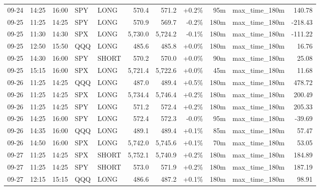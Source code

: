 \documentclass[11pt,a4paper,twoside]{article}
\begin{document}
\begin{center}
\begin{longtable}{>{\color{txtmain}}l l l l l r r r r >{\color{txtmain}}l r}
09-24 & 14:25 & 16:00 & SPY & LONG & 570.4 & 571.2 & \textcolor{wingreen}{+0.2\%} & 95m & max\_time\_180m & \textcolor{wingreen}{140.78} \\
09-25 & 11:25 & 14:25 & SPY & LONG & 570.9 & 569.7 & \textcolor{lossred}{-0.2\%} & 180m & max\_time\_180m & \textcolor{lossred}{-218.43} \\
09-25 & 11:30 & 14:30 & SPX & LONG & 5,730.0 & 5,724.2 & \textcolor{lossred}{-0.1\%} & 180m & max\_time\_180m & \textcolor{lossred}{-111.22} \\
09-25 & 12:50 & 15:50 & QQQ & LONG & 485.6 & 485.8 & \textcolor{wingreen}{+0.0\%} & 180m & max\_time\_180m & \textcolor{wingreen}{16.76} \\
09-25 & 14:30 & 16:00 & SPY & SHORT & 570.2 & 570.0 & \textcolor{wingreen}{+0.0\%} & 90m & max\_time\_180m & \textcolor{wingreen}{25.08} \\
09-25 & 15:15 & 16:00 & SPX & LONG & 5,721.4 & 5,722.6 & \textcolor{wingreen}{+0.0\%} & 45m & max\_time\_180m & \textcolor{wingreen}{11.68} \\
09-26 & 11:25 & 14:25 & QQQ & LONG & 487.0 & 489.4 & \textcolor{wingreen}{+0.5\%} & 180m & max\_time\_180m & \textcolor{wingreen}{478.72} \\
09-26 & 11:25 & 14:25 & SPX & LONG & 5,734.4 & 5,746.4 & \textcolor{wingreen}{+0.2\%} & 180m & max\_time\_180m & \textcolor{wingreen}{200.49} \\
09-26 & 11:25 & 14:25 & SPY & LONG & 571.2 & 572.4 & \textcolor{wingreen}{+0.2\%} & 180m & max\_time\_180m & \textcolor{wingreen}{205.33} \\
09-26 & 14:25 & 16:00 & SPY & LONG & 572.4 & 572.3 & \textcolor{lossred}{-0.0\%} & 95m & max\_time\_180m & \textcolor{lossred}{-39.69} \\
09-26 & 14:35 & 16:00 & QQQ & LONG & 489.1 & 489.4 & \textcolor{wingreen}{+0.1\%} & 85m & max\_time\_180m & \textcolor{wingreen}{57.47} \\
09-26 & 14:50 & 16:00 & SPX & LONG & 5,742.0 & 5,745.6 & \textcolor{wingreen}{+0.1\%} & 70m & max\_time\_180m & \textcolor{wingreen}{53.05} \\
09-27 & 11:25 & 14:25 & SPX & SHORT & 5,752.1 & 5,740.9 & \textcolor{wingreen}{+0.2\%} & 180m & max\_time\_180m & \textcolor{wingreen}{184.89} \\
09-27 & 11:25 & 14:25 & SPY & SHORT & 573.0 & 571.9 & \textcolor{wingreen}{+0.2\%} & 180m & max\_time\_180m & \textcolor{wingreen}{187.19} \\
09-27 & 12:15 & 15:15 & QQQ & LONG & 486.6 & 487.2 & \textcolor{wingreen}{+0.1\%} & 180m & max\_time\_180m & \textcolor{wingreen}{98.91} \\

\end{longtable}
\end{center}
\end{document}
